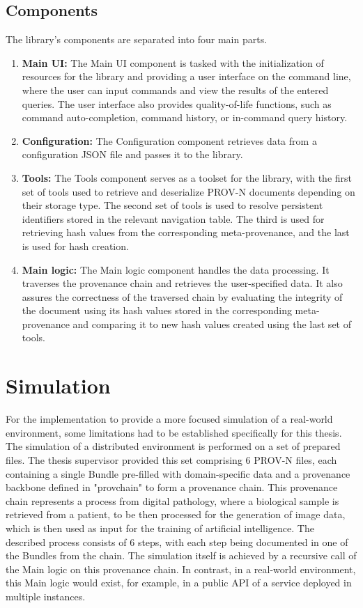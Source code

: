 \documentclass[
  digital,     %
  oneside,     %
  nosansbold,  %
  nocolorbold, %
  lof,         %
  lot,         %
]{fithesis4}
\begin{document}
\subsection{Components}
\shorthandoff{-}
The library's components are separated into four main parts.
\begin{enumerate}
    \item \textbf{Main UI:}
        The Main UI component is tasked with the initialization of resources for the library and providing a user interface on the command line, where the user can input commands and view the results of the entered queries. The user interface also provides quality-of-life functions, such as command auto-completion, command history, or in-command query history.
    \item \textbf{Configuration:}
        The Configuration component retrieves data from a configuration JSON file and passes it to the library.
    \item \textbf{Tools:}
        The Tools component serves as a toolset for the library, with the first set of tools used to retrieve and deserialize PROV-N documents depending on their storage type. 
        The second set of tools is used to resolve persistent identifiers stored in the relevant navigation table.
        The third is used for retrieving hash values from the corresponding meta-provenance, and the last is used for hash creation.
    \item \textbf{Main logic:}
        The Main logic component handles the data processing. It traverses the provenance chain and retrieves the user-specified data. It also assures the correctness of the traversed chain by evaluating the integrity of the document using its hash values stored in the corresponding meta-provenance and comparing it to new hash values created using the last set of tools.
\end{enumerate}
\shorthandon{-}

\section{Simulation}
\shorthandoff{-}
For the implementation to provide a more focused simulation of a real-world environment, some limitations had to be established specifically for this thesis. The simulation of a distributed environment is performed on a set of prepared files. The thesis supervisor provided this set comprising 6 PROV-N files, each containing a single Bundle pre-filled with domain-specific data and a provenance backbone defined in "provchain" to form a provenance chain. This provenance chain represents a process from digital pathology, where a biological sample is retrieved from a patient, to be then processed for the generation of image data, which is then used as input for the training of artificial intelligence. The described process consists of 6 steps, with each step being documented in one of the Bundles from the chain. The simulation itself is achieved by a recursive call of the Main logic on this provenance chain. In contrast, in a real-world environment, this Main logic would exist, for example, in a public API of a service deployed in multiple instances. 
\end{document}
